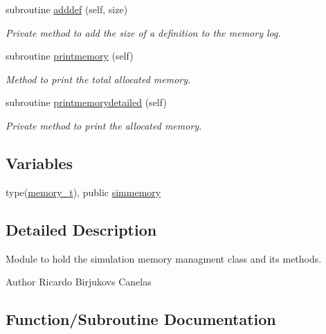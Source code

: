 \begin{DoxyCompactItemize}
subroutine \mbox{\hyperlink{namespacesimulation__memory__mod_ac6d6853bc462947d24a8f6234d625138}{adddef}} (self, size)
\begin{DoxyCompactList}\small\item\em Private method to add the size of a definition to the memory log. \end{DoxyCompactList}\item 
subroutine \mbox{\hyperlink{namespacesimulation__memory__mod_a16a7a1c7e88fe5a5523d23f83f0e04a0}{printmemory}} (self)
\begin{DoxyCompactList}\small\item\em Method to print the total allocated memory. \end{DoxyCompactList}\item 
subroutine \mbox{\hyperlink{namespacesimulation__memory__mod_a894bd4ec7462fd634d328ee5be4c6483}{printmemorydetailed}} (self)
\begin{DoxyCompactList}\small\item\em Private method to print the allocated memory. \end{DoxyCompactList}\end{DoxyCompactItemize}
\subsection*{Variables}
\begin{DoxyCompactItemize}
\item 
type(\mbox{\hyperlink{structsimulation__memory__mod_1_1memory__t}{memory\+\_\+t}}), public \mbox{\hyperlink{namespacesimulation__memory__mod_af3e2714796469b4b1ec247569b184088}{simmemory}}
\end{DoxyCompactItemize}


\subsection{Detailed Description}
Module to hold the simulation memory managment class and its methods. 

\begin{DoxyAuthor}{Author}
Ricardo Birjukovs Canelas 
\end{DoxyAuthor}


\subsection{Function/\+Subroutine Documentation}
\mbox{\label{namespacesimulation__memory__mod_a4169689db37b3ba35e092096a7019f80}} 

